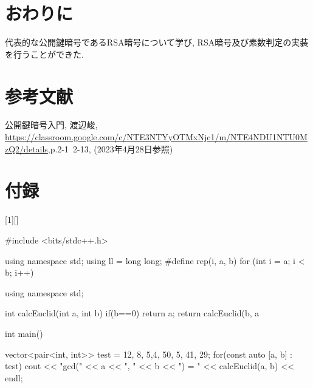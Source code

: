 \documentclass[xelatex, 11pt, a4paper, ja=standard]{bxjsarticle}
\begin{document}
\section{おわりに}
代表的な公開鍵暗号であるRSA暗号について学び, RSA暗号及び素数判定の実装を行うことができた. 


\section*{参考文献}
公開鍵暗号入門, 渡辺峻, 
\url{https://classroom.google.com/c/NTE3NTYyOTMxNjc1/m/NTE4NDU1NTU0MzQ2/details},p.2-1~2-13,
(2023年4月28日参照)

\section*{付録}

[1][]
    {\lstset{
        frame=single,
        basicstyle=\ttfamily,
        numbers=left,
        numbersep=10pt,
        tabsize=2,
        extendedchars=true,
        xleftmargin=17pt,
        framexleftmargin=17pt,
        #1
    }
}{}

\begin{mylisting}[language=c++,caption=演習課題1のソースコード]
    #include <bits/stdc++.h>

    using namespace std;
    using ll = long long;
    #define rep(i, a, b) for (int i = a; i < b; i++)
    
    
    
    using namespace std;
    
    int calcEuclid(int a, int b){  
        if(b==0){
            return a;
        }
        return calcEuclid(b, a%
    }
    
    int main(){
    
        vector<pair<int, int>> test = 
        {{12, 8}, {5,4}, {50, 5}, {41, 29}};
        for(const auto [a, b] : test){
            cout << "gcd(" << a << ", " << b << ") = " 
            << calcEuclid(a, b) << endl;
        }
        
    }
\end{mylisting}
\end{document}
